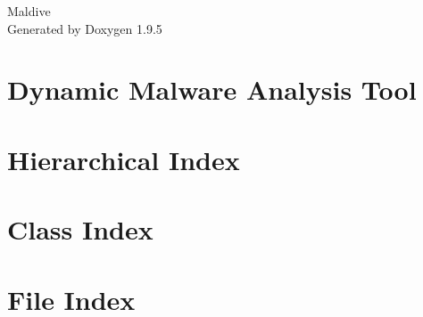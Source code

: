 \documentclass[twoside]{book}
\newcommand{\+}{\discretionary{\mbox{\scriptsize$\hookleftarrow$}}{}{}}
\newcommand{\clearemptydoublepage}{%
    \newpage{\pagestyle{empty}\cleardoublepage}%
  }
\begin{document}
  \raggedbottom
    \hypersetup{pageanchor=false,
                bookmarksnumbered=true,
                pdfencoding=unicode
               }
  \begin{titlepage}
  \vspace*{7cm}
  \begin{center}%
  {\Large Maldive}\\
  \vspace*{1cm}
  {\large Generated by Doxygen 1.9.5}\\
  \end{center}
  \end{titlepage}
  \clearemptydoublepage
  \tableofcontents
  \clearemptydoublepage
  \hypersetup{pageanchor=true}
\chapter{Dynamic Malware Analysis Tool}
\label{md__r_e_a_d_m_e}

\chapter{Hierarchical Index}

\chapter{Class Index}

\chapter{File Index}

\end{document}
